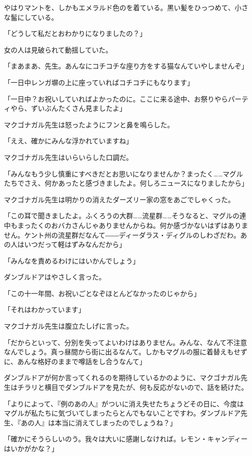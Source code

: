 \documentclass[10pt,a4paper]{article}
\begin{document}
\begin{CJK}{UTF8}{min}
やはりマントを、しかもエメラルド色のを着ている。黒い髪をひっつめて、小さな髷にしている。

「どうして私だとおわかりになりましたの？」

女の人は見破られて動揺していた。

「まあまあ、先生。あんなにコチコチな座り方をする猫なんていやしませんぞ」

「一日中レンガ塀の上に座っていればコチコチにもなります」

「一日中？お祝いしていればよかったのに。ここに来る途中、お祭りやらパーティやら、ずいぶんたくさん見ましたよ」

マクゴナガル先生は怒ったようにフンと鼻を鳴らした。

「ええ、確かにみんな浮かれていますね」

マクゴナガル先生はいらいらした口調だ。

「みんなもう少し慎重にすべきだとお思いになりませんか？まったく……マグルたちでさえ、何かあったと感づきましたよ。何しろニュースになりましたから」

マクゴナガル先生は明かりの消えたダーズリー家の窓をあごでしゃくった。

「この耳で聞きましたよ。ふくろうの大群……流星群……そうなると、マグルの連中もまったくのおバカさんじゃありませんからね。何か感づかないはずはありません。ケント州の流星群だなんて――ディーダラス・ディグルのしわざだわ。あの人はいつだって軽はずみなんだから」

「みんなを責めるわけにはいかんでしょう」

ダンブルドアはやさしく言った。

「この十一年間、お祝いごとなぞほとんどなかったのじゃから」

「それはわかっています」

マクゴナガル先生は腹立たしげに言った。

「だからといって、分別を失ってよいわけはありません。みんな、なんて不注意なんでしょう。真っ昼間から街に出るなんて。しかもマグルの服に着替えもせずに、あんな格好のままで噂話をし合うなんて」

ダンブルドアが何か言ってくれるのを期待しているかのように、マクゴナガル先生はチラリと横目でダンブルドアを見たが、何も反応がないので、話を続けた。

「よりによって、『例のあの人』がついに消え失せたちょうどその日に、今度はマグルが私たちに気づいてしまったらとんでもないことですわ。ダンブルドア先生、『あの人』は本当に消えてしまったのでしょうね？」

「確かにそうらしいのう。我々は大いに感謝しなければ。レモン・キャンディーはいかがかな？」


\end{CJK}
\end{document}
